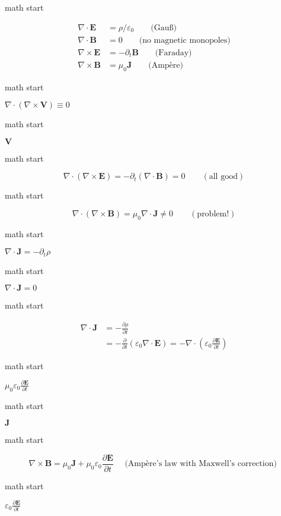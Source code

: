 math start

\[\begin{aligned}
\nabla\cdot\mathbf{E}& =\rho / \varepsilon_0\qquad\text{(Gau\ss)}\\
\nabla\cdot\mathbf{B}&=0\qquad\text{(no magnetic monopoles)}\\
\nabla\times\mathbf{E}&=-\partial_t \mathbf{B}\qquad\text{(Faraday)}\\
\nabla\times\mathbf{B}&=\mu_0 \mathbf{J}\qquad\text{(Ampère)}
\end{aligned}\]

math start

\(\nabla\cdot(\nabla\times\mathbf{V})\equiv 0\)

math start

\(\mathbf{V}\)

math start

\[\nabla\cdot(\nabla\times\mathbf{E})=-\partial_t (\nabla\cdot\mathbf{B})=0 \qquad(\text{all good})\]

math start

\[\nabla\cdot(\nabla\times\mathbf{B})=\mu_0 \nabla\cdot\mathbf{J}\neq 0 \qquad(\text{problem!})\]

math start

\(\nabla\cdot\mathbf{J}= -\partial_t \rho\)

math start

\(\nabla\cdot\mathbf{J}= 0\)

math start

\[\begin{aligned}
\nabla\cdot\mathbf{J}&=-\frac{\partial \rho}{\partial t} \\
&=-\frac{\partial}{\partial t}\left(\varepsilon_0\nabla\cdot\mathbf{E}\right)=-\nabla\cdot\left(\varepsilon_0 \frac{\partial \mathbf{E}}{\partial t}\right)
\end{aligned}\]

math start

\(\mu_0 \varepsilon_0 \frac{\partial \mathbf{E}}{\partial t}\)

math start

\(\mathbf{J}\)

math start

\[\nabla\times\mathbf{B}=\mu_0 \mathbf{J}+\mu_0 \varepsilon_0 \frac{\partial \mathbf{E}}{\partial t} \quad \text { (Ampère's law with Maxwell's correction) }\]

math start

\(\varepsilon_0 \frac{\partial \mathbf{E}}{\partial t}\)

